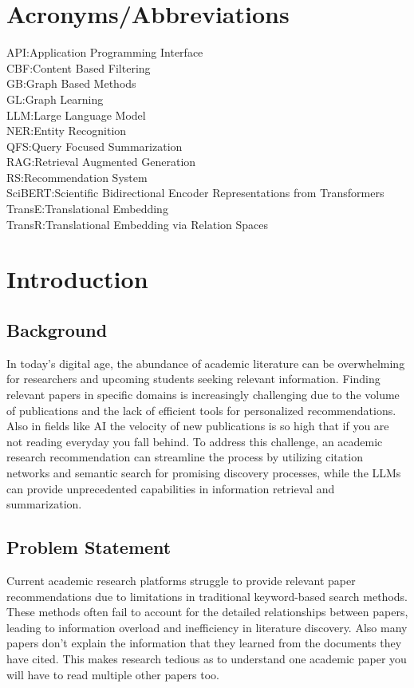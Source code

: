 \documentclass[a4paper,12pt]{article}
\begin{document}
\section*{Acronyms/Abbreviations}
API:\quad Application Programming Interface\\
CBF:\quad Content Based Filtering\\
GB:\quad Graph Based Methods\\
GL:\quad Graph Learning\\
LLM:\quad Large Language Model\\
NER:\quad Entity Recognition\\
QFS:\quad Query Focused Summarization\\
RAG:\quad Retrieval Augmented Generation\\
RS:\quad Recommendation System\\
SciBERT:\quad Scientific Bidirectional Encoder Representations from Transformers\\
TransE:\quad Translational Embedding\\
TransR:\quad Translational Embedding via Relation Spaces
\newpage

\setcounter{page}{1}

\section{Introduction}
\subsection{Background}
In today's digital age, the abundance of academic literature can be overwhelming
for researchers and upcoming students seeking relevant information. Finding relevant
papers in specific domains is increasingly challenging due to the volume of
publications and the lack of efficient tools for personalized recommendations. Also
in fields like AI the velocity of new publications is so high that if you are not
reading everyday you fall behind. To address this challenge, an academic research
recommendation can streamline the process by utilizing citation networks and
semantic search for promising discovery processes, while the LLMs can provide
unprecedented capabilities in information retrieval and summarization.

\subsection{Problem Statement}
Current academic research platforms struggle to provide relevant paper
recommendations due to limitations in traditional keyword-based search methods.
These methods often fail to account for the detailed relationships between papers,
leading to information overload and inefficiency in literature discovery. Also many
papers don't explain the information that they learned from the documents they
have cited. This makes research tedious as to understand one academic paper you
will have to read multiple other papers too.
\end{document}
